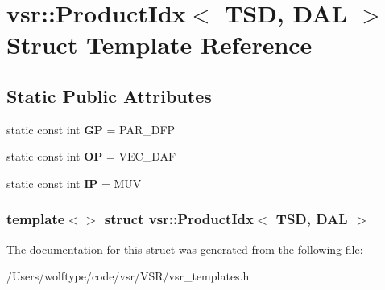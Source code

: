 \hypertarget{structvsr_1_1_product_idx_3_01_t_s_d_00_01_d_a_l_01_4}{\section{vsr\-:\-:Product\-Idx$<$ T\-S\-D, D\-A\-L $>$ Struct Template Reference}
\label{structvsr_1_1_product_idx_3_01_t_s_d_00_01_d_a_l_01_4}
}
\subsection*{Static Public Attributes}
\begin{DoxyCompactItemize}
\item 
\hypertarget{structvsr_1_1_product_idx_3_01_t_s_d_00_01_d_a_l_01_4_a623cc1c615eb7d0b61a5275075c76c17}{static const int {\bfseries G\-P} = P\-A\-R\-\_\-\-D\-F\-P}\label{structvsr_1_1_product_idx_3_01_t_s_d_00_01_d_a_l_01_4_a623cc1c615eb7d0b61a5275075c76c17}

\item 
\hypertarget{structvsr_1_1_product_idx_3_01_t_s_d_00_01_d_a_l_01_4_aca2e264c0f3046c06b6a3f322c9f887c}{static const int {\bfseries O\-P} = V\-E\-C\-\_\-\-D\-A\-F}\label{structvsr_1_1_product_idx_3_01_t_s_d_00_01_d_a_l_01_4_aca2e264c0f3046c06b6a3f322c9f887c}

\item 
\hypertarget{structvsr_1_1_product_idx_3_01_t_s_d_00_01_d_a_l_01_4_a408436a643c656b8394662daf799f670}{static const int {\bfseries I\-P} = M\-U\-V}\label{structvsr_1_1_product_idx_3_01_t_s_d_00_01_d_a_l_01_4_a408436a643c656b8394662daf799f670}

\end{DoxyCompactItemize}
\subsubsection*{template$<$$>$ struct vsr\-::\-Product\-Idx$<$ T\-S\-D, D\-A\-L $>$}



The documentation for this struct was generated from the following file\-:\begin{DoxyCompactItemize}
\item 
/\-Users/wolftype/code/vsr/\-V\-S\-R/vsr\-\_\-templates.\-h\end{DoxyCompactItemize}
